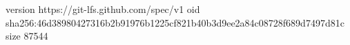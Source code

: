 version https://git-lfs.github.com/spec/v1
oid sha256:46d38980427316b2b91976b1225cf821b40b3d9ee2a84c08728f689d7497d81c
size 87544
